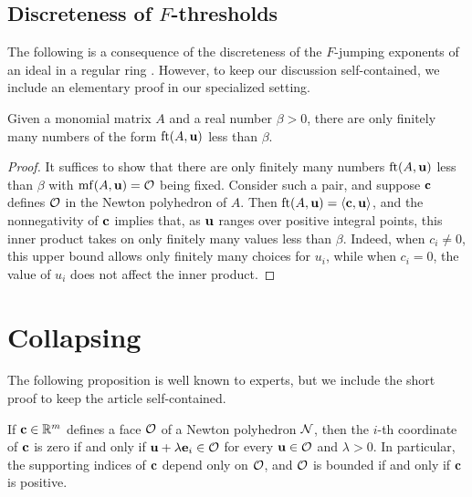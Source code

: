 \documentclass[11pt]{amsart}
\begin{document}

\subsection{Discreteness of $F$-thresholds}

The following is a consequence of the discreteness of the $F$-jumping exponents of an ideal in a regular ring \cite[Theorem~3.1]{blickle+mustata+smith.discr_rat_FPTs}.
However, to keep our discussion self-contained, we include an elementary proof in our specialized setting.

\begin{proposition}
\label{discreteness: L}
Given a monomial matrix $A$ and a real number $\beta > 0 $, there are only finitely many numbers of the form $\operatorname{ft}(A, \mathbf{u})$ less than $\beta$.
\end{proposition}

\begin{proof}
   It suffices to show that there are only finitely many numbers $\operatorname{ft}(A, \mathbf{u})$ less than $\beta$ with $\operatorname{mf}(A, \mathbf{u}) = \mathcal{O}$ being fixed.
   Consider such a pair, and suppose $\mathbf{c}$ defines $\mathcal{O}$ in the Newton polyhedron of $A$.
   Then $\operatorname{ft}(A, \mathbf{u}) = \langle \mathbf{c}, \mathbf{u} \rangle$, and the nonnegativity of $\mathbf{c}$ implies that, as $\mathbf{u}$ ranges over positive integral points, this inner product takes on only finitely many values less than $\beta$.
   Indeed, when $c_i \ne 0$, this upper bound allows only finitely many choices for $u_i$, while when $c_i = 0$, the value of $u_i$ does not affect the inner product.
\end{proof}


\newpage
\section{Collapsing}

The following proposition is well known to experts, but we include the short proof to keep the article self-contained.

\begin{proposition}
   \label{face: P}
   If $\mathbf{c} \in \mathbb{R}^m$ defines a face $\mathcal{O}$ of a Newton polyhedron $\mathcal{N}$, then the $i$-th coordinate of $\mathbf{c}$ is zero if and only if $\mathbf{u} + \lambda \mathbf{e}_i \in \mathcal{O}$  for every $\mathbf{u} \in \mathcal{O}$ and $\lambda > 0$.
   In particular, the supporting indices of $\mathbf{c}$ depend only on $\mathcal{O}$, and $\mathcal{O}$ is bounded if and only if $\mathbf{c}$ is positive.
\end{proposition}
\end{document}
